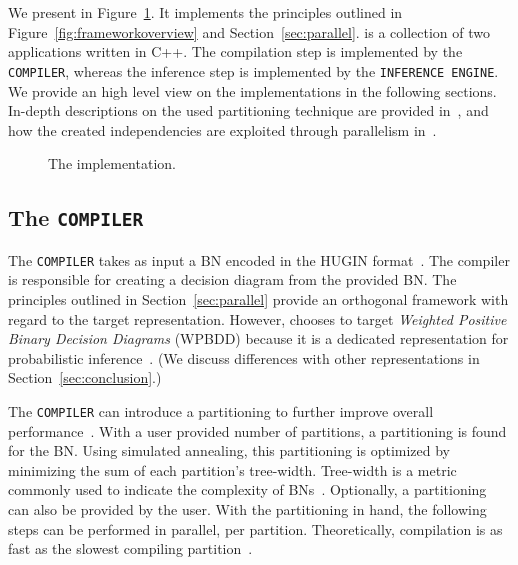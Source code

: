 \section{\toolname}

We present \toolname in Figure~\ref{fig:implementation}. It implements the principles outlined in Figure~\ref{fig:frameworkoverview} and Section~\ref{sec:parallel}. \toolname is a collection of two applications written in C++. The compilation step is implemented by the \verb+COMPILER+, whereas the inference step is implemented by the \verb+INFERENCE ENGINE+. We provide an high level view on the implementations in the following sections.
In-depth descriptions on the used partitioning technique are provided in~\cite{dal2017reducing,dal2021compositional}, and how the created independencies are exploited through parallelism in~\cite{dal2018parallel}.

\begin{figure}[!t]
    \centering
    
    \caption{The implementation.}
    \label{fig:implementation}
\end{figure}

\subsection{The \texttt{COMPILER}}

The \verb+COMPILER+ takes as input a BN encoded in the HUGIN format~\cite{madsen2003hugin}. The compiler is responsible for creating a decision diagram from the provided BN. The principles outlined in Section~\ref{sec:parallel} provide an orthogonal framework with regard to the target representation. However, \toolname chooses to target \emph{Weighted Positive Binary Decision Diagrams} (WPBDD) because it is a dedicated representation for probabilistic inference~\cite{dal2017wpbdd}. (We discuss differences with other representations in Section~\ref{sec:conclusion}.)

The \texttt{COMPILER} can introduce a partitioning to further improve overall performance~\cite{dal2017reducing}. With a user provided number of partitions, a partitioning is found for the BN. Using simulated annealing, this partitioning is optimized by minimizing the sum of each partition's tree-width. Tree-width is a metric commonly used to indicate the complexity of BNs~\cite{bollig2014width}. Optionally, a partitioning can also be provided by the user. With the partitioning in hand, the following steps can be performed in parallel, per partition. Theoretically, compilation is as fast as the slowest compiling partition~\cite{dal2018parallel}.

